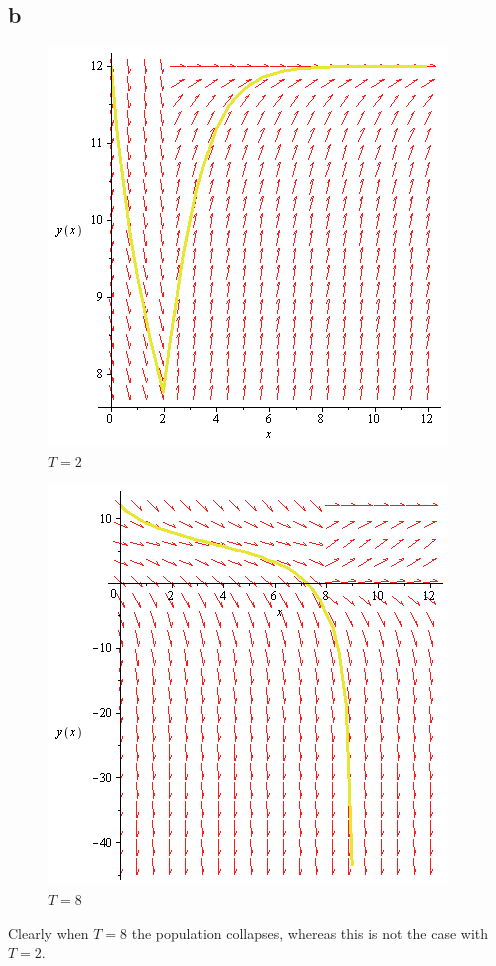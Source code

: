 \documentclass{unswmaths}
\begin{document}
\subsection*{b}
\begin{figure}[H]
    \includegraphics[scale=0.3]{population_2}
    \caption{$T=2$}
\end{figure}

\begin{figure}[H]
    \includegraphics[scale=0.3]{population_8}
    \caption{$T=8$}
\end{figure}
Clearly when $ T = 8 $ the population collapses, whereas this is not the case with $ T = 2 $. 
\end{document}
